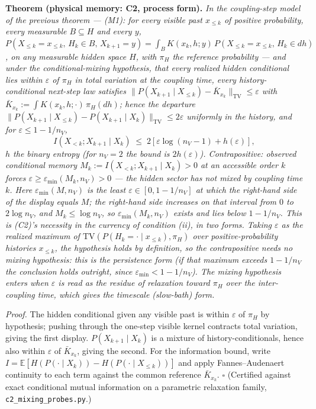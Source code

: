 \documentclass[
]{article}
\begin{document}
\textbf{Theorem (physical memory: C2, process form).} \emph{In the
coupling-step model of the previous theorem --- (M1): for every visible
past \(x_{\leq k}\) of positive probability, every measurable
\(B \subseteq H\) and every \(y\),
\(P(X_{\leq k} = x_{\leq k},\, H_k \in B,\, X_{k+1} = y) = \int_B K(x_k, h; y)\, P(X_{\leq k} = x_{\leq k},\, H_k \in dh)\),
on any measurable hidden space \(H\), with \(\pi_H\) the reference
probability --- and under the conditional-mixing hypothesis, that every
realized hidden conditional lies within \(\varepsilon\) of \(\pi_H\) in
total variation at the coupling time, every history-conditional
next-step law satisfies
\(\|P(X_{k+1} \mid X_{\leq k}) - \bar{K}_{x_k}\|_{\mathrm{TV}} \leq \varepsilon\)
with \(\bar{K}_{x_k} := \int K(x_k, h; \cdot)\,\pi_H(dh)\); hence the
departure
\(\|P(X_{k+1} \mid X_{\leq k}) - P(X_{k+1} \mid X_k)\|_{\mathrm{TV}} \leq 2\varepsilon\)
uniformly in the history, and for \(\varepsilon \leq 1 - 1/n_V\),}
\[I(X_{<k}; X_{k+1} \mid X_k) \;\leq\; 2\left[\varepsilon \log(n_V - 1) + h(\varepsilon)\right],\]
\emph{\(h\) the binary entropy (for \(n_V = 2\) the bound is
\(2h(\varepsilon)\)). Contrapositive: observed conditional memory
\(M_k := I(X_{<k}; X_{k+1} \mid X_k) > 0\) at an accessible order \(k\)
forces \(\varepsilon \geq \varepsilon_{\min}(M_k, n_V) > 0\) --- the
hidden sector has not mixed by coupling time \(k\). Here
\(\varepsilon_{\min}(M, n_V)\) is the least
\(\varepsilon \in [0, 1 - 1/n_V]\) at which the right-hand side of the
display equals \(M\); the right-hand side increases on that interval
from \(0\) to \(2\log n_V\), and \(M_k \leq \log n_V\), so
\(\varepsilon_{\min}(M_k, n_V)\) exists and lies below \(1 - 1/n_V\).
This is (C2)'s necessity in the currency of condition (ii), in two
forms. Taking \(\varepsilon\) as the realized maximum of
\(\mathrm{TV}(P(H_k = \cdot \mid x_{\leq k}), \pi_H)\) over
positive-probability histories \(x_{\leq k}\), the hypothesis holds by
definition, so the contrapositive needs no mixing hypothesis: this is
the persistence form (if that maximum exceeds \(1 - 1/n_V\) the
conclusion holds outright, since \(\varepsilon_{\min} < 1 - 1/n_V\)).
The mixing hypothesis enters when \(\varepsilon\) is read as the residue
of relaxation toward \(\pi_H\) over the inter-coupling time, which gives
the timescale (slow-bath) form.}

\emph{Proof.} The hidden conditional given any visible past is within
\(\varepsilon\) of \(\pi_H\) by hypothesis; pushing through the one-step
visible kernel contracts total variation, giving the first display.
\(P(X_{k+1} \mid X_k)\) is a mixture of history-conditionals, hence also
within \(\varepsilon\) of \(\bar{K}_{x_k}\), giving the second. For the
information bound, write
\(I = \mathbb{E}[H(P(\cdot \mid X_k)) - H(P(\cdot \mid X_{\leq k}))]\)
and apply Fannes--Audenaert continuity to each term against the common
reference \(\bar{K}_{x_k}\). \(\square\) (Certified against exact
conditional mutual information on a parametric relaxation family,
\texttt{c2\_mixing\_probes.py}.)
\end{document}
